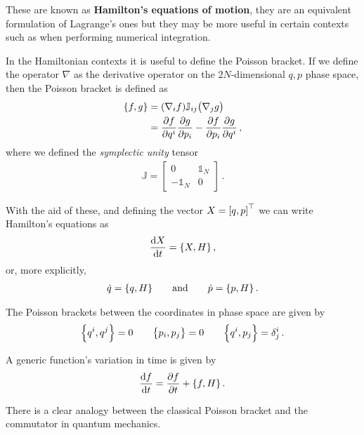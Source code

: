 \documentclass[main.tex]{subfiles}
\begin{document}
These are known as \textbf{Hamilton's equations of motion}, they are an equivalent formulation of Lagrange's ones but they may be more useful in certain contexts such as when performing numerical integration.

In the Hamiltonian contexts it is useful to define the Poisson bracket. 
If we define the operator \(\nabla\) as the derivative operator on the \(2N\)-dimensional \(q, p\) phase space, then the Poisson bracket is defined as 
%
\begin{subequations}
\begin{align}
\qty{f, g} &= \qty(\nabla_{i} f) \mathbb{J}_{ij} \qty(\nabla_{j} g)  \\
&= \pdv{f}{q^{i}} \pdv{g}{p_{i}}
- \pdv{f}{p_{i}} \pdv{g}{q^{i}}
\,,
\end{align}
\end{subequations}
%
where we defined the \emph{symplectic unity} tensor 
%
\begin{subequations}
\begin{align}
\mathbb{J} = \left[\begin{array}{cc}
0 & \mathbb{1}_{N} \\ 
-\mathbb{1}_{N} & 0 
\end{array}\right]
\,.
\end{align}
\end{subequations}

With the aid of these, and defining the vector \(X = \qty[q, p]^{\top}\) we can write Hamilton's equations as 
%
\begin{align}
\dv{X}{t} = \qty{X, H}
\,,
\end{align}
%
or, more explicitly, 
%
\begin{align}
\dot{q} = \qty{q, H}
\qquad \text{and} \qquad
\dot{p} = \qty{p, H}
\,.
\end{align}

The Poisson brackets between the coordinates in phase space are given by 
%
\begin{align}
\qty{q^{i}, q^{j}} = 0
 \qquad
\qty{p_{i}, p_{j}} = 0
\qquad 
\qty{q^{i}, p_{j}} = \delta^{i}_{j}
\,.
\end{align}

A generic function's variation in time is given by 
%
\begin{align}
\dv{f}{t} = \pdv{f}{t} + \qty{f, H}
\,.
\end{align}

There is a clear analogy between the classical Poisson bracket and the commutator in quantum mechanics.
\end{document}
